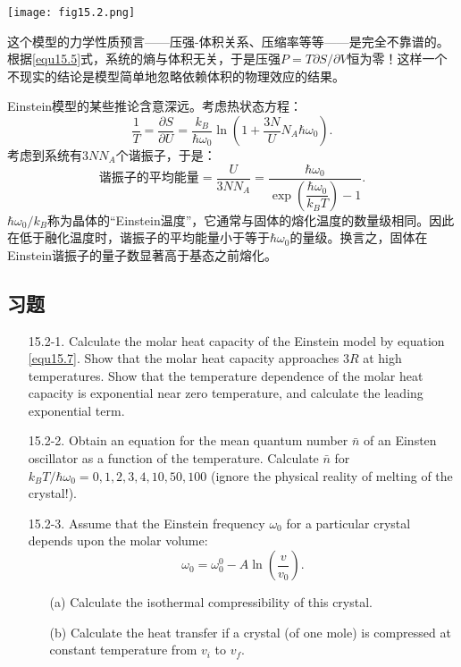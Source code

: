 {
	\centering
	\texttt{[image: fig15.2.png]}
	\label{fig15.2}
}

这个模型的力学性质预言——压强-体积关系、压缩率等等——是完全不靠谱的。根据\eqref{equ15.5}式，系统的熵与体积无关，于是压强$P = T \partial S / \partial V$恒为零！这样一个不现实的结论是模型简单地忽略依赖体积的物理效应的结果。

Einstein模型的某些推论含意深远。考虑热状态方程：
\begin{equation}
	\frac{1}{T} = \frac{\partial S}{\partial U} = \frac{k_B}{\hbar \omega_0} \ln \left(1 + \frac{3N}{U} N_A \hbar \omega_0 \right).
\label{equ15.6}
\end{equation}
考虑到系统有$3 N N_A$个谐振子，于是：
\begin{equation}
	\text{谐振子的平均能量} = \frac{U}{3N N_A} = \frac{\hbar \omega_0}{\exp \left( \dfrac{\hbar \omega_0}{k_B T} \right) - 1}.
\label{equ15.7}
\end{equation}
$\hbar \omega_0 / k_B$称为晶体的“Einstein温度”，它通常与固体的熔化温度的数量级相同。因此在低于融化温度时，谐振子的平均能量小于等于$\hbar \omega_0$的量级。换言之，固体在Einstein谐振子的量子数显著高于基态之前熔化。

\subsection*{习题}
\begin{itemize}
	\item[15.2-1.] Calculate the molar heat capacity of the Einstein model by equation \eqref{equ15.7}. Show that the molar heat capacity approaches $3R$ at high temperatures. Show that the temperature dependence of the molar heat capacity is exponential near zero temperature, and calculate the leading exponential term.
	\item[15.2-2.] Obtain an equation for the mean quantum number $\bar{n}$ of an Einsten oscillator as a function of the temperature. Calculate $\bar{n}$ for $k_B T / \hbar \omega_0 = 0, 1, 2, 3, 4, 10, 50, 100$ (ignore the physical reality of melting of the crystal!).
	\item[15.2-3.] Assume that the Einstein frequency $\omega_0$ for a particular crystal depends upon the molar volume:
	\[
		\omega_0 = \omega_0^0 - A \ln \left( \frac{v}{v_0} \right).
	\]
	\begin{itemize}
		\item[(a)] Calculate the isothermal compressibility of this crystal.
		\item[(b)] Calculate the heat transfer if a crystal (of one mole) is compressed at constant temperature from $v_i$ to $v_f$.
	\end{itemize}
\end{itemize}

